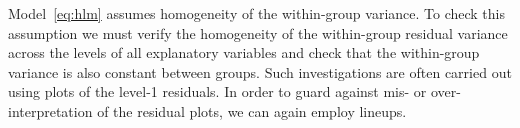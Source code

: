 \documentclass[12pt]{article} %
\newcommand{\hh}[1]{{\color{orange} #1}}
\newcommand{\alnote}[1]{\todo[inline,color=green!40]{#1}} %
\newcommand{\hhnote}[1]{\todo[inline,color=orange!40]{#1}}
\begin{document}







Model~\eqref{eq:hlm} assumes homogeneity of the within-group variance. To check this assumption we must verify the homogeneity of the within-group residual variance across the levels of all explanatory variables and check that the within-group variance is also constant between groups. Such investigations are often carried out using plots of the level-1 residuals. In order to guard against mis- or over-interpretation of the residual plots, we can again employ lineups.
\end{document}
